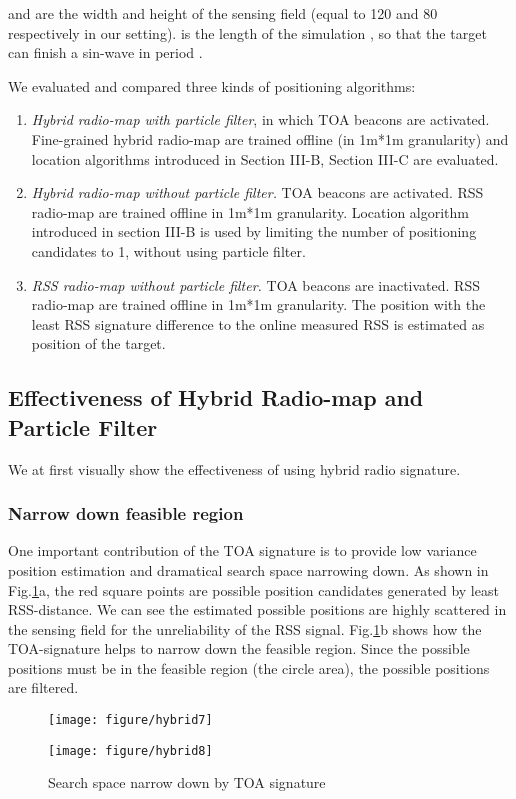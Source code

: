 \documentclass[conference, 10pt]{IEEEtran}
\begin{document}
 and  are the width and height of the sensing field (equal to 120 and 80 respectively in our setting).  is the length of the simulation , so that the target can finish a sin-wave in period . 
 
We evaluated and compared three kinds of positioning algorithms:
\begin{enumerate}
\item \emph{Hybrid radio-map with particle filter}, in which TOA beacons are activated. Fine-grained hybrid radio-map are trained offline (in 1m*1m granularity) and location algorithms introduced in Section III-B, Section III-C are evaluated. 
\item \emph{Hybrid radio-map without particle filter.}  TOA beacons are activated. RSS radio-map are trained offline in 1m*1m granularity. Location algorithm introduced in section III-B is used by limiting the number of positioning candidates to 1, without using particle filter.  
\item \emph{RSS radio-map without particle filter. } TOA beacons are inactivated. RSS radio-map are trained offline in 1m*1m granularity. The position with the least RSS signature difference to the online measured RSS is estimated as position of the target. 
\end{enumerate}
\subsection{Effectiveness of Hybrid Radio-map and Particle Filter}
We at first visually  show the effectiveness of using hybrid radio signature. 
\subsubsection{Narrow down feasible region} One important contribution of the TOA signature is to provide low variance position estimation and dramatical search space narrowing down.  As shown in Fig.\ref{fig7}a, the red square points are possible position candidates  generated by least RSS-distance. We can see the estimated possible positions are highly scattered in the sensing field for the unreliability of the RSS signal. Fig.\ref{fig7}b shows how the TOA-signature helps to narrow down the feasible region. Since the possible positions must be in the feasible region (the circle area), the possible positions are filtered.   
 \begin{figure}[htbp]
\centering
  \begin{minipage}[t]{0.5\linewidth} 
    \centering 
    \texttt{[image: figure/hybrid7]} 
  \end{minipage}\begin{minipage}[t]{0.5\linewidth} 
    \centering 
    \texttt{[image: figure/hybrid8]} 
  \end{minipage}\caption{Search space narrow down by TOA signature}
    \label{fig7}
\end{figure}
\end{document}
